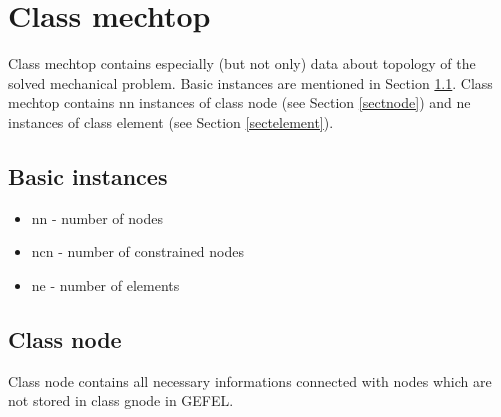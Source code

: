 \chapter{Class {\sf mechtop}}

Class mechtop contains especially (but not only) data about topology of the solved mechanical
problem. Basic instances are mentioned in Section \ref{sectmechtopbasinst}. Class mechtop
contains nn instances of class node (see Section \ref{sectnode}) and ne instances of class
element (see Section \ref{sectelement}).

\section{Basic instances}
\label{sectmechtopbasinst}
\begin{itemize}
\item{nn - number of nodes}
\item{ncn - number of constrained nodes}
\item{ne - number of elements}
\end{itemize}

\section{Class {\sf node}}
\label{sectnode}

Class {\sf node} contains all necessary informations connected with nodes which are not
stored in class {\sf gnode} in GEFEL.

